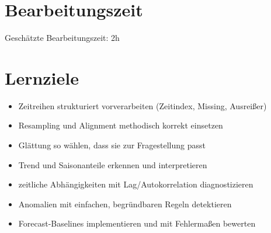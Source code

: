 \documentclass[
  ngerman,
  letterpaper,
  DIV=11]{scrreprt}
\providecommand{\tightlist}{%
  \setlength{\itemsep}{0pt}\setlength{\parskip}{0pt}}
\begin{document}
\section*{Bearbeitungszeit}\label{bearbeitungszeit}


Geschätzte Bearbeitungszeit: 2h

\section*{Lernziele}\label{lernziele}


\begin{itemize}
\tightlist
\item
  Zeitreihen strukturiert vorverarbeiten (Zeitindex, Missing, Ausreißer)
\item
  Resampling und Alignment methodisch korrekt einsetzen
\item
  Glättung so wählen, dass sie zur Fragestellung passt
\item
  Trend und Saisonanteile erkennen und interpretieren
\item
  zeitliche Abhängigkeiten mit Lag/Autokorrelation diagnostizieren
\item
  Anomalien mit einfachen, begründbaren Regeln detektieren
\item
  Forecast-Baselines implementieren und mit Fehlermaßen bewerten
\end{itemize}
\end{document}
